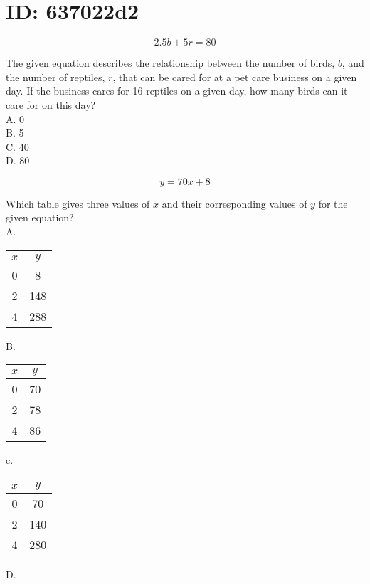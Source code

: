 \section*{ID: 637022d2}
$$
2.5 b+5 r=80
$$

The given equation describes the relationship between the number of birds, $b$, and the number of reptiles, $r$, that can be cared for at a pet care business on a given day. If the business cares for 16 reptiles on a given day, how many birds can it care for on this day?\\
A. 0\\
B. 5\\
C. 40\\
D. 80

$$
y=70 x+8
$$

Which table gives three values of $x$ and their corresponding values of $y$ for the given equation?\\
A.

\begin{center}
\begin{tabular}{|c|c|}
\hline
$x$ & $y$ \\
\hline
0 & 8 \\
\hline
2 & 148 \\
\hline
4 & 288 \\
\hline
\end{tabular}
\end{center}

B.

\begin{center}
\begin{tabular}{|c|c|}
\hline
$x$ & $y$ \\
\hline
0 & 70 \\
\hline
2 & 78 \\
\hline
4 & 86 \\
\hline
\end{tabular}
\end{center}

c.

\begin{center}
\begin{tabular}{|c|c|}
\hline
$x$ & $y$ \\
\hline
0 & 70 \\
\hline
2 & 140 \\
\hline
4 & 280 \\
\hline
\end{tabular}
\end{center}

D.


